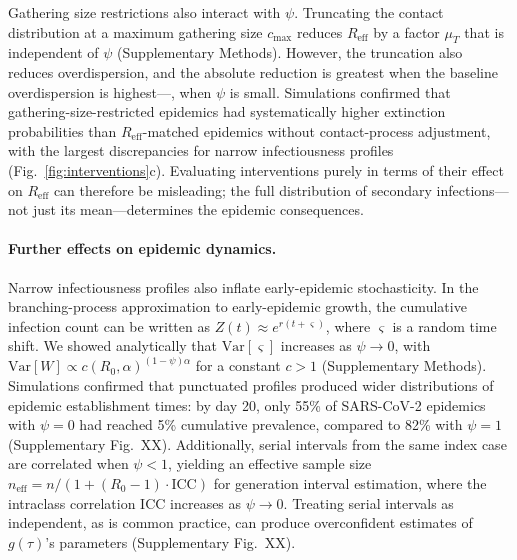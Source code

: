 Gathering size restrictions also interact with $\psi$. Truncating the contact distribution at a maximum gathering size $c_\text{max}$ reduces $R_\text{eff}$ by a factor $\mu_T$ that is independent of $\psi$ (Supplementary Methods). However, the truncation also reduces overdispersion, and the absolute reduction is greatest when the baseline overdispersion is highest---\ie, when $\psi$ is small. Simulations confirmed that gathering-size-restricted epidemics had systematically higher extinction probabilities than $R_\text{eff}$-matched epidemics without contact-process adjustment, with the largest discrepancies for narrow infectiousness profiles (Fig.~\ref{fig:interventions}c). Evaluating interventions purely in terms of their effect on $R_\text{eff}$ can therefore be misleading; the full distribution of secondary infections---not just its mean---determines the epidemic consequences.

\paragraph{Further effects on epidemic dynamics.}
Narrow infectiousness profiles also inflate early-epidemic stochasticity. In the branching-process approximation to early-epidemic growth, the cumulative infection count can be written as $Z(t) \approx e^{r(t + \varsigma)}$, where $\varsigma$ is a random time shift\citep{morris_computation_2024}. We showed analytically that $\text{Var}[\varsigma]$ increases as $\psi \to 0$, with $\text{Var}[W] \propto c(R_0, \alpha)^{(1-\psi)\alpha}$ for a constant $c > 1$ (Supplementary Methods). Simulations confirmed that punctuated profiles produced wider distributions of epidemic establishment times: by day 20, only 55\% of SARS-CoV-2 epidemics with $\psi = 0$ had reached 5\% cumulative prevalence, compared to 82\% with $\psi = 1$ (Supplementary Fig.~XX). Additionally, serial intervals from the same index case are correlated when $\psi < 1$, yielding an effective sample size $n_\text{eff} = n / (1 + (R_0 - 1) \cdot \text{ICC})$ for generation interval estimation, where the intraclass correlation ICC increases as $\psi \to 0$. Treating serial intervals as independent, as is common practice, can produce overconfident estimates of $g(\tau)$'s parameters (Supplementary Fig.~XX).

